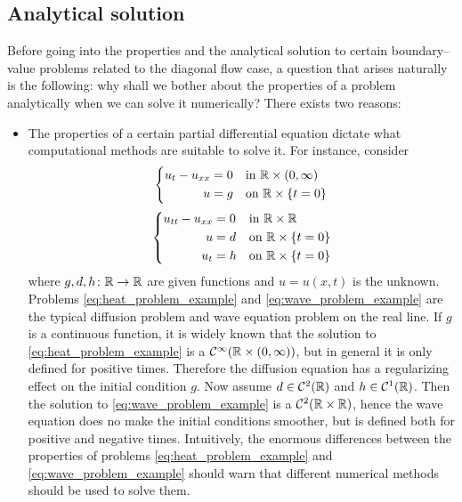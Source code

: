 
\subsection{Analytical solution}

Before going into the properties and the analytical solution to certain
boundary--value problems related to the diagonal flow case, a question that
arises naturally is the following: why shall we bother about the properties of a
problem analytically when we can solve it numerically? There exists two reasons:
\begin{itemize}
	\item The properties of a certain partial differential equation dictate what
	computational methods are suitable to solve it. For instance, consider
	\begin{equation} \label{eq:heat_problem_example}
		\begin{aligned}
			\left\{
				\begin{aligned}
					u_t - u_{xx} &= 0 & &\text{in } \mathbb{R} \times (0,\infty) \\
					u &= g & &\text{on } \mathbb{R} \times \{ t = 0 \}
				\end{aligned}
			\right.
		\end{aligned}
	\end{equation}
	\begin{equation} \label{eq:wave_problem_example}
		\begin{aligned}
			\left\{
				\begin{aligned}
					u_{tt} - u_{xx} &= 0 & &\text{in } \mathbb{R} \times \mathbb{R} \\
					u &= d & &\text{on } \mathbb{R} \times \{ t = 0 \} \\
					u_t &= h & &\text{on } \mathbb{R} \times \{ t = 0 \}
				\end{aligned}
			\right.
		\end{aligned}
	\end{equation}
	where $g, d, h \colon \mathbb{R} \to \mathbb{R}$ are given functions and $u = u(x,t)$
	is the unknown. Problems \eqref{eq:heat_problem_example} and
	\eqref{eq:wave_problem_example} are the typical diffusion problem and wave
	equation problem on the real line. If $g$ is a continuous function, it is
	widely known that the solution to \eqref{eq:heat_problem_example} is a
	$\mathcal{C}^\infty(\mathbb{R} \times (0,\infty))$, but in general it is only
	defined for positive times. Therefore the diffusion equation has a
	regularizing effect on the initial condition $g$. Now assume $d \in
	\mathcal{C}^2(\mathbb{R})$ and $h \in \mathcal{C}^1(\mathbb{R})$. Then the solution to
	\eqref{eq:wave_problem_example} is a $\mathcal{C}^2(\mathbb{R} \times \mathbb{R})$,
	hence the wave equation does no make the initial conditions smoother, but is
	defined both for positive and negative times. Intuitively, the enormous
	differences between the properties of problems
	\eqref{eq:heat_problem_example} and \eqref{eq:wave_problem_example} should
	warn that different numerical methods should be used to solve them.
	

\end{itemize}
